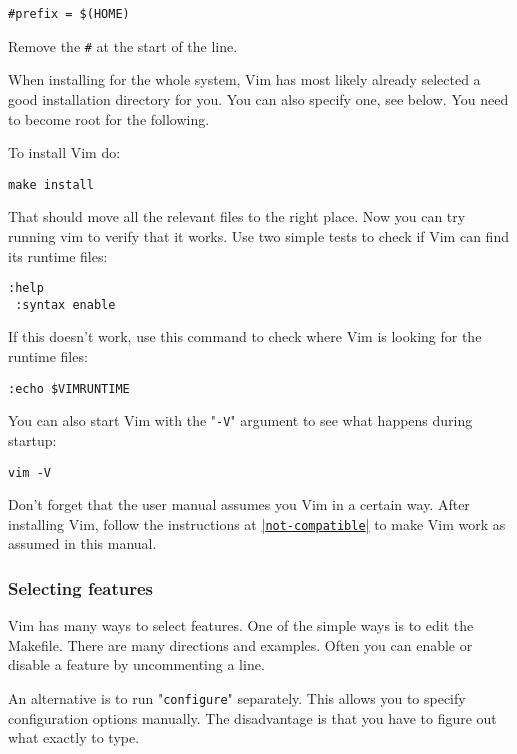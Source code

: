 \begin{Verbatim}[samepage=true]
    #prefix = $(HOME) 
\end{Verbatim}

Remove the \texttt{\#} at the start of the line.

When installing for the whole system, Vim has most likely already selected a good installation directory for you.
You can also specify one, see below.
You need to become root for the following.

To install Vim do:

\begin{Verbatim}[samepage=true]
 make install
\end{Verbatim}

That should move all the relevant files to the right place.
Now you can try running vim to verify that it works.
Use two simple tests to check if Vim can find its runtime files:

\begin{Verbatim}[samepage=true]
 :help
 :syntax enable
\end{Verbatim}

If this doesn't work, use this command to check where Vim is looking for the runtime files:

\begin{Verbatim}[samepage=true]
 :echo $VIMRUNTIME
\end{Verbatim}

You can also start Vim with the "\texttt{-V}" argument to see what happens during startup:

\begin{Verbatim}[samepage=true]
 vim -V
\end{Verbatim}

Don't forget that the user manual assumes you Vim in a certain way.
After installing Vim, follow the instructions at \hyperref[not-compatible]{|\texttt{not-compatible}|} to make Vim work as assumed in this manual.

\subsubsection{Selecting features}
Vim has many ways to select features.
One of the simple ways is to edit the Makefile.
There are many directions and examples.
Often you can enable or disable a feature by uncommenting a line.

An alternative is to run "\texttt{configure}" separately.
This allows you to specify configuration options manually.
The disadvantage is that you have to figure out what exactly to type.

